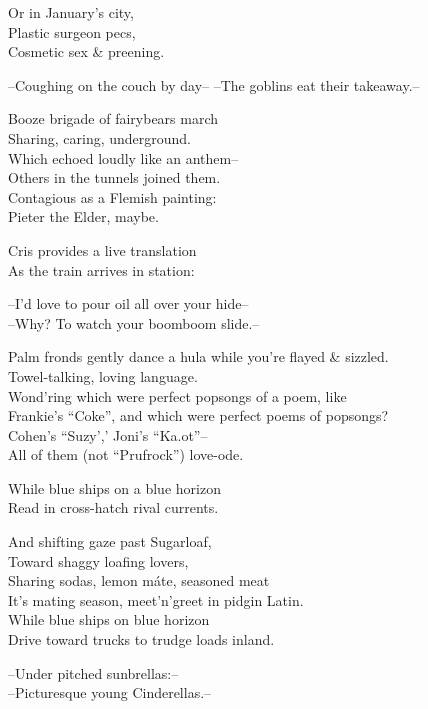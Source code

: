 
Or in January's city, \\
Plastic surgeon pecs, \\
Cosmetic sex \& preening.

--Coughing on the couch by day--
--The goblins eat their takeaway.--  

Booze brigade of fairybears march \\
Sharing, caring, underground. \\
Which echoed loudly like an anthem-- \\
Others in the tunnels joined them. \\
Contagious as a Flemish painting: \\
Pieter the Elder, maybe.

Cris provides a live translation \\
As the train arrives in station:

--I'd love to pour oil all over your hide-- \\
--Why? To watch your boomboom slide.--

\secdiv

Palm fronds gently dance a hula while you're flayed \& sizzled. \\
Towel-talking, loving language. \\
Wond'ring which were perfect popsongs of a poem, like \\
Frankie's ``Coke'', and which were perfect poems of popsongs? \\
Cohen's ``Suzy',' Joni's ``Ka{\textsci}.o{\textupsilon}t''-- \\
All of them (not ``Prufrock'') love-ode. 

While blue ships on a blue horizon \\
Read in cross-hatch rival currents. 

And shifting gaze past Sugarloaf, \\
Toward shaggy loafing lovers, \\
Sharing sodas, lemon máte, seasoned meat \\
It's mating season, meet'n'greet in pidgin Latin. \\
While blue ships on blue horizon \\
Drive toward trucks to trudge loads inland.

--Under pitched sunbrellas:-- \\
--Picturesque young Cinderellas.--

